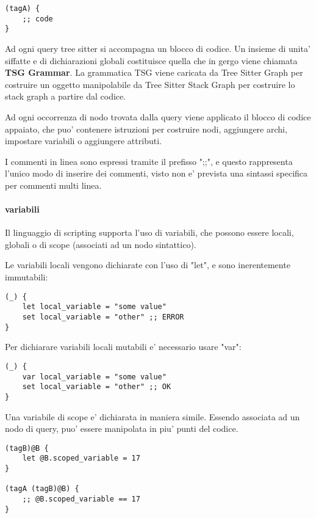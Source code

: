 \begin{verbatim}
(tagA) {
    ;; code
}
\end{verbatim}

Ad ogni query tree sitter si accompagna un blocco di codice.
Un insieme di unita' siffatte e di dichiarazioni globali costituisce quella che in gergo viene chiamata \textbf{TSG Grammar}. La grammatica TSG viene caricata da Tree Sitter Graph per costruire un oggetto manipolabile da Tree Sitter Stack Graph per costruire lo stack graph a partire dal codice.

Ad ogni occorrenza di nodo trovata dalla query viene applicato il blocco di codice appaiato, che puo' contenere istruzioni per costruire nodi, aggiungere archi, impostare variabili o aggiungere attributi.

I commenti in linea sono espressi tramite il prefisso ";;", e questo rappresenta l'unico modo di inserire dei commenti, visto non e' prevista una sintassi specifica per commenti multi linea.

\paragraph{variabili}
Il linguaggio di scripting supporta l'uso di variabili, che possono essere locali, globali o di scope (associati ad un nodo sintattico).

Le variabili locali vengono dichiarate con l'uso di "let", e sono inerentemente immutabili:

\begin{verbatim}
(_) {
    let local_variable = "some value"
    set local_variable = "other" ;; ERROR
}
\end{verbatim}

Per dichiarare variabili locali mutabili e' necessario usare "var":

\begin{verbatim}
(_) {
    var local_variable = "some value"
    set local_variable = "other" ;; OK
}
\end{verbatim}

Una variabile di scope e' dichiarata in maniera simile. Essendo associata ad un nodo di query, puo' essere manipolata in piu' punti del codice.

\begin{verbatim}
(tagB)@B {
    let @B.scoped_variable = 17
}

(tagA (tagB)@B) {
    ;; @B.scoped_variable == 17
}
\end{verbatim}

